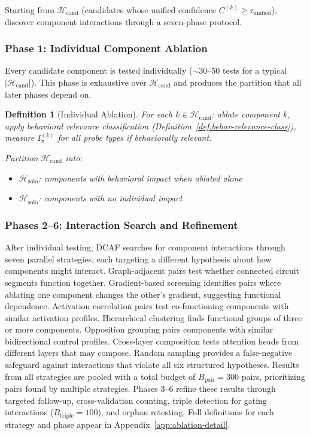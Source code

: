 \documentclass[11pt]{article}
\newtheorem{definition}{Definition}[section]
\begin{document}
Starting from $\mathcal{H}_{\text{cand}}$ (candidates whose unified confidence $C^{(k)} \geq \tau_{\text{unified}}$), discover component interactions through a seven-phase protocol.

\subsubsection{Phase 1: Individual Component Ablation}
\label{sec:phase-1-individual-component-ablation}

Every candidate component is tested individually ($\sim$30--50 tests for a typical $|\mathcal{H}_{\text{cand}}|$). This phase is exhaustive over $\mathcal{H}_{\text{cand}}$ and produces the partition that all later phases depend on.

\begin{definition}[Individual Ablation]
\label{def:individual-ablation}
For each $k \in \mathcal{H}_{\text{cand}}$: ablate component $k$, apply behavioral relevance classification (Definition~\ref{def:behav-relevance-class}), measure $I^{(k)}_\pi$ for all probe types if behaviorally relevant.

Partition $\mathcal{H}_{\text{cand}}$ into:
\begin{itemize}[nosep]
\item $\mathcal{H}_{\text{solo}}$: components with behavioral impact when ablated alone
\item $\mathcal{H}_{\overline{\text{solo}}}$: components with no individual impact
\end{itemize}
\end{definition}

\subsubsection{Phases 2--6: Interaction Search and Refinement}

After individual testing, DCAF searches for component interactions through seven parallel strategies, each targeting a different hypothesis about how components might interact. Graph-adjacent pairs test whether connected circuit segments function together. Gradient-based screening identifies pairs where ablating one component changes the other's gradient, suggesting functional dependence. Activation correlation pairs test co-functioning components with similar activation profiles. Hierarchical clustering finds functional groups of three or more components. Opposition grouping pairs components with similar bidirectional control profiles. Cross-layer composition tests attention heads from different layers that may compose. Random sampling provides a false-negative safeguard against interactions that violate all six structured hypotheses. Results from all strategies are pooled with a total budget of $B_{\text{pair}} = 300$ pairs, prioritizing pairs found by multiple strategies. Phases 3--6 refine these results through targeted follow-up, cross-validation counting, triple detection for gating interactions ($B_{\text{triple}} = 100$), and orphan retesting. Full definitions for each strategy and phase appear in Appendix~\ref{app:ablation-detail}.
\end{document}
